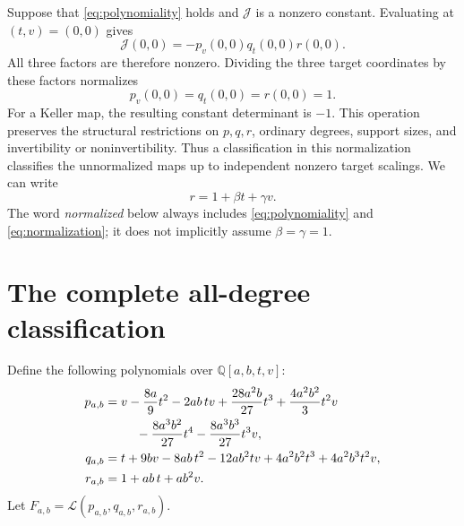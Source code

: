\documentclass[11pt,a4paper]{article}
\numberwithin{equation}{section}
\theoremstyle{definition}
\theoremstyle{remark}
\newcommand{\Q}{\mathbb{Q}}
\newcommand{\J}{\mathcal{J}}
\begin{document}
Suppose that \eqref{eq:polynomiality} holds and $\J$ is a nonzero constant.
Evaluating at $(t,v)=(0,0)$ gives
\begin{equation}\label{eq:originJ}
\J(0,0)=-p_v(0,0)q_t(0,0)r(0,0).
\end{equation}
All three factors are therefore nonzero. Dividing the three target
coordinates by these factors normalizes
\begin{equation}\label{eq:normalization}
p_v(0,0)=q_t(0,0)=r(0,0)=1.
\end{equation}
For a Keller map, the resulting constant determinant is $-1$.
This operation preserves the structural restrictions on $p,q,r$, ordinary
degrees, support sizes, and invertibility or noninvertibility. Thus a
classification in this normalization classifies the unnormalized maps up
to independent nonzero target scalings. We can write
\begin{equation}\label{eq:r}
r=1+\beta t+\gamma v.
\end{equation}
The word \emph{normalized} below always includes
\eqref{eq:polynomiality} and \eqref{eq:normalization}; it does not implicitly
assume $\beta=\gamma=1$.

\section{The complete all-degree classification}
\label{sec:main}

Define the following polynomials over $\Q[a,b,t,v]$:
\begin{subequations}\label{eq:family}
\begin{align}
p_{a,b}={}&v-\frac{8a}{9}t^2-2ab\,tv
 +\frac{28a^2b}{27}t^3+\frac{4a^2b^2}{3}t^2v \notag\\
 &\hspace{1.2em}-\frac{8a^3b^2}{27}t^4-\frac{8a^3b^3}{27}t^3v,
 \label{eq:familyp}\\
q_{a,b}={}&t+9bv-8ab\,t^2-12ab^2tv
 +4a^2b^2t^3+4a^2b^3t^2v,\label{eq:familyq}\\
r_{a,b}={}&1+ab\,t+ab^2v.\label{eq:familyr}
\end{align}
\end{subequations}
Let $F_{a,b}=\mathcal L(p_{a,b},q_{a,b},r_{a,b})$.
\end{document}
